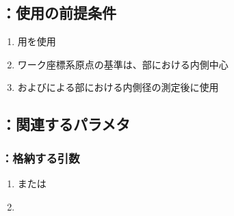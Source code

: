 \subsection{\KEndFaceRight：使用の前提条件}
\begin{enumerate}[label*=\sarrow]
\item \EndFacecutMilling 用\FaceMill を使用
\item {}ワーク座標系原点の基準は、\EndFace 部における内側中心
\item \MXIWidth および\MYIWidth による\EndFace 部における内側径の測定後に使用
\end{enumerate}


\subsection{\KEndFaceRight：関連するパラメタ}

\subsubsection{\KEndFaceRight：格納する引数}
\begin{enumerate}[label*=\sarrow]
\item \PMTopReAlocationLength または\PMBottomReAlocationLength
\item \PMODCornerR
\end{enumerate}

